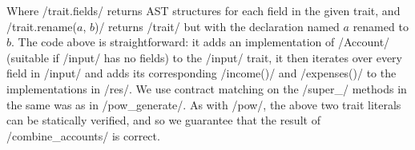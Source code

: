 \noindent Where /trait.fields/ returns AST structures for each field in the given trait, and /trait.rename($a$, $b$)/ returns /trait/ but with the declaration named $a$ renamed to $b$. The code above is straightforward: it adds an implementation of /Account/ (suitable if /input/ has no fields) to the /input/ trait, it then iterates over every field in /input/ and adds its corresponding /income()/ and /expenses()/ to the implementations in /res/. We use contract matching on the  /super_/ methods in the same was as in /pow_generate/. As with /pow/, the above two trait literals can be statically verified, and so we guarantee that the result of /combine_accounts/ is correct.